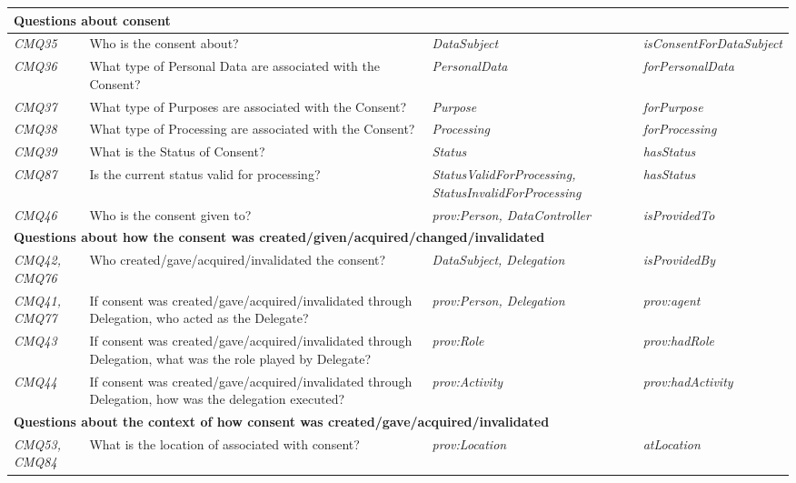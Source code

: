 \begin{center}
\begin{tabularx}{\textwidth}{|p{1cm}|X|p{4cm}|p{3.5cm}|}
\multicolumn{4}{|l|}{\textbf{Questions about consent}} \\ \hline
\textit{CMQ35} & Who is the consent about? & \textit{DataSubject} & \textit{isConsentForDataSubject} \\ \hline
\textit{CMQ36} & What type of Personal Data are associated with the Consent? & \textit{PersonalData} & \textit{forPersonalData} \\ \hline
\textit{CMQ37} & What type of Purposes are associated with the Consent? & \textit{Purpose} & \textit{forPurpose} \\ \hline
\textit{CMQ38} & What type of Processing are associated with the Consent? & \textit{Processing} & \textit{forProcessing} \\ \hline
\textit{CMQ39} & What is the Status of Consent? & \textit{Status} & \textit{hasStatus} \\ \hline
\textit{CMQ87} & Is the current status valid for processing? & \textit{StatusValidForProcessing, StatusInvalidForProcessing} & \textit{hasStatus} \\ \hline
\textit{CMQ46} & Who is the consent given to? & \textit{prov:Person, DataController} & \textit{isProvidedTo} \\ \hline
\multicolumn{4}{|l|}{\textbf{Questions about how the consent was created/given/acquired/changed/invalidated}} \\ \hline
\textit{CMQ42, CMQ76} & Who created/gave/acquired/invalidated the consent? & \textit{DataSubject, Delegation} & \textit{isProvidedBy} \\ \hline
\textit{CMQ41, CMQ77} & If consent was created/gave/acquired/invalidated through Delegation, who acted as the Delegate? & \textit{prov:Person, Delegation} & \textit{prov:agent} \\ \hline
\textit{CMQ43} & If consent was created/gave/acquired/invalidated through Delegation, what was the role played by Delegate? & \textit{prov:Role} & \textit{prov:hadRole} \\ \hline
\textit{CMQ44} & If consent was created/gave/acquired/invalidated through Delegation, how was the delegation executed? & \textit{prov:Activity} & \textit{prov:hadActivity} \\ \hline
\multicolumn{4}{|l|}{\textbf{Questions about the context of how consent was created/gave/acquired/invalidated}} \\ \hline
\textit{CMQ53, CMQ84} & What is the location of associated with consent? & \textit{prov:Location} & \textit{atLocation} \\ \hline

\end{tabularx}
\end{center}
